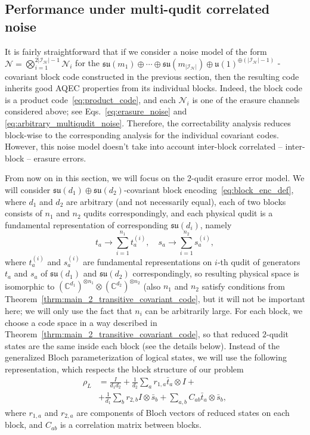\documentclass[10pt,twocolumn,superscriptaddress,aps,amsmath,amssymb,citeautoscript,floatfix,prx,longbibliography]{revtex4-2}
\theoremstyle{plain}
\theoremstyle{plain}
\theoremstyle{plain}
\theoremstyle{plain}
\theoremstyle{plain}
\theoremstyle{plain}
\begin{document}
\subsection{Performance under multi-qudit correlated noise}\label{subsec:main_covar_analog_noise}

It is fairly straightforward that if we consider a noise model of the form
$
\mathcal N
=
\bigotimes_{i=1}^{2|\mathcal I_{\mathcal H}|-1}
\mathcal N_i
$
for the
$
\mathfrak{su}(m_1)\oplus\cdots\oplus
\mathfrak{su}(m_{|\mathcal I_{\mathcal H}|})
\oplus
\mathfrak{u}(1)^{\oplus(|\mathcal I_{\mathcal H}|-1)}
$
-covariant block code constructed in the previous section, then the resulting code inherits good AQEC properties from its individual blocks. Indeed, the block code is a product code~\eqref{eq:product_code}, and each \(\mathcal N_i\) is one of the erasure channels considered above; see Eqs.~\eqref{eq:erasure_noise} and \eqref{eq:arbitrary_multiqudit_noise}. Therefore, the correctability analysis reduces block-wise to the corresponding analysis for the individual covariant codes.
However, this noise model doesn't take into account inter-block correlated -- inter-block -- erasure errors.

From now on in this section, we will focus on the $2$-qudit erasure error model. We will consider $\mathfrak{su}(d_1)\oplus\mathfrak{su}(d_2)$-covariant
block encoding~\eqref{eq:block_enc_def}, where $d_1$ and $d_2$ are arbitrary (and not necessarily equal), each of two blocks consists of $n_1$ and $n_2$ qudits correspondingly, and
each physical qudit is a fundamental representation of corresponding $\mathfrak{su}(d_i)$, namely
\[
    t_a \rightarrow \sum_{i=1}^{n_1} t_a^{(i)}, \quad s_a \rightarrow \sum_{i=1}^{n_2} s_a^{(i)},
\]
where $t_a^{(i)}$ and $s_a^{(i)}$ are fundamental representations on $i$-th qudit of generators $t_a$ and $s_a$ of $\mathfrak{su}(d_1)$ and $\mathfrak{su}(d_2)$ correspondingly,
so resulting physical space is isomorphic to $(\mathbb{C}^{d_1})^{\otimes n_1}\otimes (\mathbb{C}^{d_2})^{\otimes n_2}$ (also $n_1$ and $n_2$
satisfy conditions from Theorem~\ref{thrm:main_2_transitive_covariant_code}, but it will not be important here; we will only use the fact that $n_i$ can be arbitrarily large. For each block, we choose a code space in a way described in Theorem~\ref{thrm:main_2_transitive_covariant_code}, so that reduced $2$-qudit states are the same inside each block (see the details below).
Instead of the generalized Bloch parameterization of logical states, we will use the following representation, which respects the block structure of our problem
\[
\begin{aligned}
    \rho_L&=\frac{I}{d_1 d_2}+\frac{1}{d_2} \sum_a r_{1,a} \bar{t}_a \otimes I+\\&+\frac{1}{d_1} \sum_b r_{2,b} I \otimes \bar{s}_b+\sum_{a, b} C_{a b} \bar{t}_a \otimes \bar{s}_b,
\end{aligned}
\]
where $r_{1, a}$ and $r_{2, a}$ are components of Bloch vectors of reduced states on each block, and $C_{a b}$ is a correlation matrix between blocks.
\end{document}
